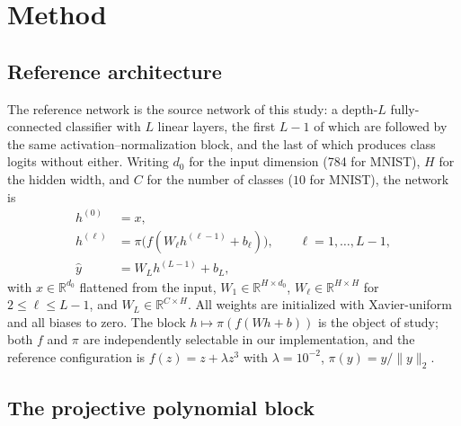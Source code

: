 \section{Method}
\label{sec:method}

\subsection{Reference architecture}

The reference network is the source network of this study: a depth-$L$
fully-connected classifier with $L$ linear layers, the first $L-1$ of which
are followed by the same activation--normalization block, and the last of
which produces class logits without either. Writing $d_0$ for the input
dimension (784 for MNIST), $H$ for the hidden width, and $C$ for the number of
classes ($10$ for MNIST), the network is
\begin{align}
h^{(0)} &= x, \\
h^{(\ell)} &= \pi\bigl(f(W_{\ell} h^{(\ell-1)} + b_{\ell})\bigr),
  \qquad \ell = 1,\dots,L-1, \label{eq:block}\\
\hat{y} &= W_{L} h^{(L-1)} + b_{L},
\end{align}
with $x \in \mathbb{R}^{d_0}$ flattened from the input, $W_1 \in
\mathbb{R}^{H \times d_0}$, $W_\ell \in \mathbb{R}^{H \times H}$ for
$2 \le \ell \le L-1$, and $W_L \in \mathbb{R}^{C \times H}$. All weights are
initialized with Xavier-uniform and all biases to zero. The block
$h \mapsto \pi(f(Wh+b))$ is the object of study; both $f$ and $\pi$ are
independently selectable in our implementation, and the reference
configuration is $f(z) = z + \lambda z^{3}$ with $\lambda = 10^{-2}$,
$\pi(y) = y / \lVert y \rVert_2$.

\subsection{The projective polynomial block}

